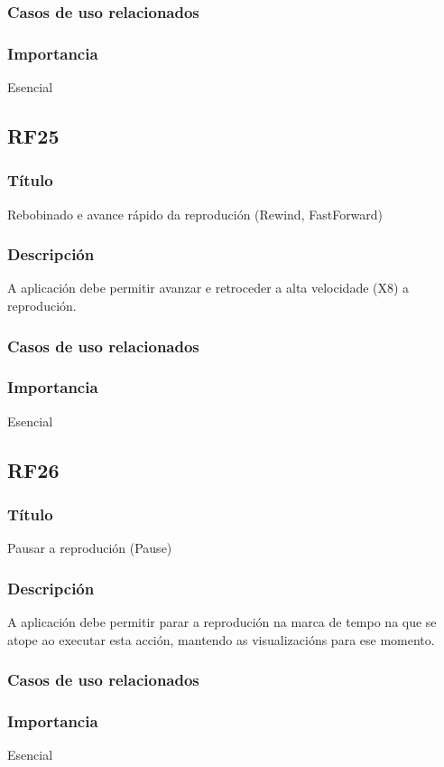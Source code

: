 \subsubsection{Casos de uso relacionados}
\subsubsection{Importancia}
Esencial

\subsection*{RF25}
\subsubsection{Título}
Rebobinado e avance rápido da reprodución (Rewind, FastForward)
\subsubsection{Descripción}
A aplicación debe permitir avanzar e retroceder a alta velocidade (X8) a reprodución.
\subsubsection{Casos de uso relacionados}
\subsubsection{Importancia}
Esencial

\subsection*{RF26}
\subsubsection{Título}
Pausar a reprodución (Pause)
\subsubsection{Descripción}
A aplicación debe permitir parar a reprodución na marca de tempo na que se atope ao executar esta acción, mantendo as visualizacións para ese momento.
\subsubsection{Casos de uso relacionados}
\subsubsection{Importancia}
Esencial

